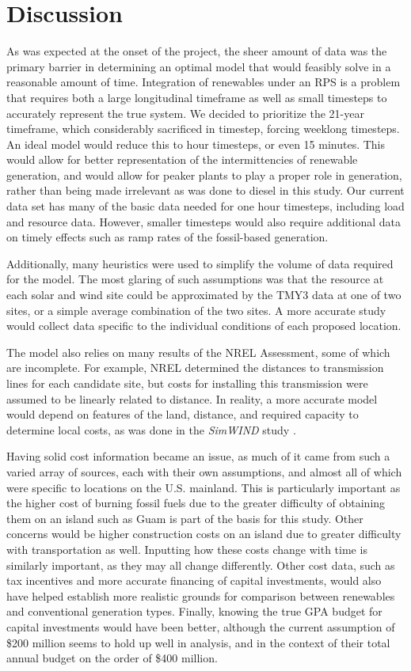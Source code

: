 \documentclass[12pt,letterpaper,fleqn]{article}
\begin{document}
\section{Discussion}

As was expected at the onset of the project, the sheer amount of data
was the primary barrier in determining an optimal model that would
feasibly solve in a reasonable amount of time. Integration of
renewables under an RPS is a problem that requires both a large
longitudinal timeframe as well as small timesteps to accurately
represent the true system. We decided to prioritize the 21-year
timeframe, which considerably sacrificed in timestep, forcing weeklong
timesteps. An ideal model would reduce this to hour timesteps, or even
15 minutes. This would allow for better representation of the intermittencies 
of renewable generation, and would allow for peaker plants to play a proper
role in generation, rather than being made irrelevant as was done to diesel
in this study. Our current data set has many of the basic data needed for
one hour timesteps, including load and resource data. However, smaller
timesteps would also require additional data on timely effects such as
ramp rates of the fossil-based generation. 

Additionally, many heuristics were used to simplify the volume of data
required for the model. The most glaring of such assumptions was that the
resource at each solar and wind site could be approximated by the TMY3
data at one of two sites, or a simple average combination of the two
sites. A more accurate study would collect data specific to the
individual conditions of each proposed location.

The model also relies on many results of the NREL Assessment, some of
which are incomplete. For example, NREL determined the distances to
transmission lines for each candidate site, but costs for installing
this transmission were assumed to be linearly related to distance. In
reality, a more accurate model would depend on features of the land,
distance, and required capacity to determine local costs, as was done
in the \emph{SimWIND} study \cite{phillips12}. 

Having solid cost information became an issue, as much of it came from
such a varied array of sources, each with their own assumptions, and
almost all of which were specific to locations on the
U.S. mainland. This is particularly important as the higher cost of
burning fossil fuels due to the greater difficulty of obtaining them
on an island such as Guam is part of the basis for this study. Other
concerns would be higher construction costs on an island due to
greater difficulty with transportation as well. Inputting how these
costs change with time is similarly important, as they may all change
differently. Other cost data, such as tax incentives and more accurate
financing of capital investments, would also have helped establish
more realistic grounds for comparison between renewables and
conventional generation types. Finally, knowing the true GPA budget
for capital investments would have been better, although the current
assumption of \$200 million seems to hold up well in analysis, and in
the context of their total annual budget on the order of \$400
million.
\end{document}
